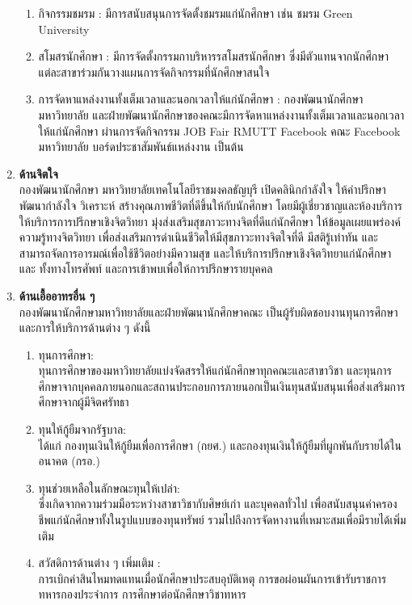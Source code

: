\begin{enumerate}
\begin{enumerate}[label=\arabic*), leftmargin=1.2cm]
\item กิจกรรมชมรม : มีการสนับสนุนการจัดตั้งชมรมแก่นักศึกษา เช่น ชมรม Green University 
\item สโมสรนักศึกษา : มีการจัดตั้งกรรมกาบริหารรสโมสรนักศึกษา ซึ่งมีตัวแทนจากนักศึกษาแต่ละสาขาร่วมกันวางแผนการจัดกิจกรรมที่นักศึกษาสนใจ
\item การจัดหาแหล่งงานทั้งเต็มเวลาและนอกเวลาให้แก่นักศึกษา : กองพัฒนานักศึกษา มหาวิทยาลัย และฝ่ายพัฒนานักศึกษาของคณะมีการจัดหาแหล่งงานทั้งเต็มเวลาและนอกเวลาให้แก่นักศึกษา ผ่านการจัดกิจกรรม JOB Fair RMUTT  Facebook คณะ Facebook มหาวิทยาลัย บอร์ดประชาสัมพันธ์แหล่งงาน เป็นต้น
\end{enumerate}
\item {\bf ด้านจิตใจ }\\
กองพัฒนานักศึกษา มหาวิทยาลัยเทคโนโลยีราชมงคลธัญบุรี เปิดคลินิกกำลังใจ ให้คำปรึกษา พัฒนากำลังใจ วิเคราะห์ สร้างคุณภาพชีวิตที่ดีขึ้นให้กับนักศึกษา โดยมีผู้เชี่ยวชาญและห้องบริการให้บริการการปรึกษาเชิงจิตวิทยา มุ่งส่งเสริมสุขภาวะทางจิตที่ดีแก่นักศึกษา ให้ข้อมูลเผยแพร่องค์ความรู้ทางจิตวิทยา เพื่อส่งเสริมการดำเนินชีวิตให้มีสุขภาวะทางจิตใจที่ดี มีสติรู้เท่าทัน และสามารถจัดการอารมณ์เพื่อใช้ชีวิตอย่างมีความสุข และให้บริการปรึกษาเชิงจิตวิทยาแก่นักศึกษาและ ทั้งทางโทรศัพท์ และการเข้าพบเพื่อให้การปรึกษารายบุคคล 
\item {\bf ด้านเอื้ออาทรอื่น ๆ }\\
กองพัฒนานักศึกษามหาวิทยาลัยและฝ่ายพัฒนานักศึกษาคณะ เป็นผู้รับผิดชอบงานทุนการศึกษา และการให้บริการด้านต่าง ๆ ดังนี้
\begin{enumerate}[label=\arabic*), leftmargin=1.25cm]
\item ทุนการศึกษา:\\ทุนการศึกษาของมหาวิทยาลัยแบ่งจัดสรรให้แก่นักศึกษาทุกคณะและสาขาวิชา และทุนการศึกษาจากบุคคลภายนอกและสถานประกอบการภายนอกเป็นเงินทุนสนับสนุนเพื่อส่งเสริมการศึกษาจากผู้มีจิตศรัทธา
\item ทุนให้กู้ยืมจากรัฐบาล:  \\ได้แก่ กองทุนเงินให้กู้ยืมเพื่อการศึกษา (กยศ.) และกองทุนเงินให้กู้ยืมที่ผูกพันกับรายได้ในอนาคต (กรอ.)
\item ทุนช่วยเหลือในลักษณะทุนให้เปล่า: \\ซึ่งเกิดจากความร่วมมือระหว่างสาขาวิชากับศิษย์เก่า และบุคคลทั่วไป เพื่อสนับสนุนค่าครองชีพแก่นักศึกษาทั้งในรูปแบบของทุนทรัพย์ รวมไปถึงการจัดหางานที่เหมาะสมเพื่อมีรายได้เพิ่มเติม
\item สวัสดิการด้านต่าง ๆ เพิ่มเติม : \\การเบิกค่าสินไหมทดแทนเมื่อนักศึกษาประสบอุบัติเหตุ การขอผ่อนผันการเข้ารับราชการทหารกองประจำการ การศึกษาต่อนักศึกษาวิชาทหาร
\end{enumerate}
\end{enumerate}

